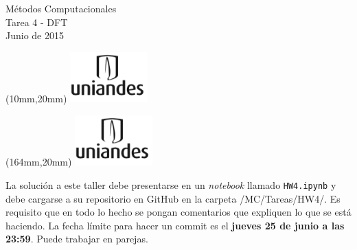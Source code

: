 \documentclass[11pt,letterpaper]{exam}
\begin{document}
\begin{center}
{\Large Métodos Computacionales} \\
Tarea 4 - DFT \\
Junio de 2015
\end{center}

\begin{textblock*}{40mm}(10mm,20mm)
  \includegraphics[width=3cm]{logoUniandes.png}
\end{textblock*}

\begin{textblock*}{40mm}(164mm,20mm)
  \includegraphics[width=3cm]{logoUniandes.png}
\end{textblock*}

\vspace{0.5cm}

La solución a este taller debe presentarse en un {\it notebook} llamado \verb+HW4.ipynb+ y debe cargarse a su repositorio en GitHub en la carpeta /MC/Tareas/HW4/. Es requisito que en todo lo hecho se pongan comentarios que expliquen lo que se está haciendo. La fecha límite para hacer un commit es el \textbf{jueves 25 de junio a las 23:59}. Puede trabajar en parejas.

\vspace{0.5cm}
\end{document}
